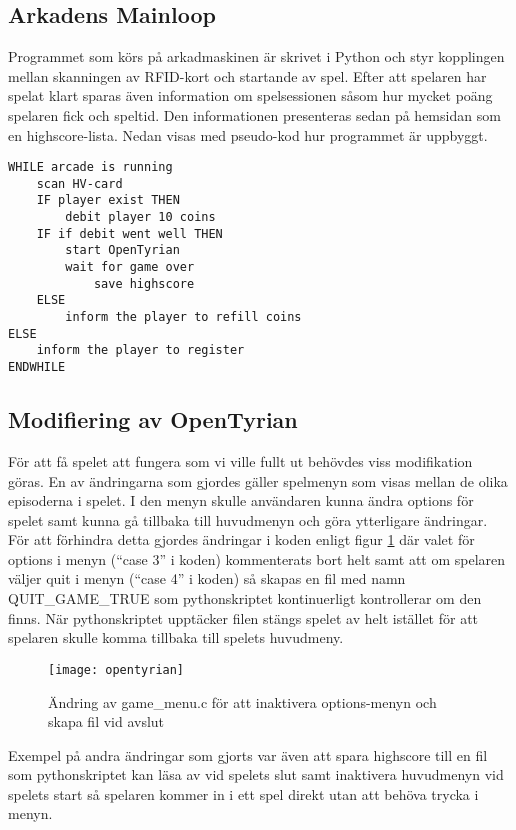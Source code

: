 \documentclass[12pt,fleqn,openany]{book} %
\begin{document}
\subsection{Arkadens Mainloop}
Programmet som körs på arkadmaskinen är skrivet i Python och styr kopplingen mellan skanningen av RFID-kort och startande av spel. 
Efter att spelaren har spelat klart sparas även information om spelsessionen såsom hur mycket poäng spelaren fick och speltid. 
Den informationen presenteras sedan på hemsidan som en highscore-lista. Nedan visas med pseudo-kod hur programmet är uppbyggt. 

\begin{verbatim}
WHILE arcade is running
    scan HV-card
    IF player exist THEN
        debit player 10 coins
    IF if debit went well THEN
        start OpenTyrian
        wait for game over
            save highscore
    ELSE
        inform the player to refill coins
ELSE
    inform the player to register
ENDWHILE
\end{verbatim}

\subsection{Modifiering av OpenTyrian}
För att få spelet att fungera som vi ville fullt ut behövdes viss modifikation göras. En av ändringarna som gjordes 
gäller spelmenyn som visas mellan de olika episoderna i spelet. I den menyn skulle användaren kunna ändra options för 
spelet samt kunna gå tillbaka till huvudmenyn och göra ytterligare ändringar. 
För att förhindra detta gjordes ändringar i koden enligt figur \ref{fig_opentyrian} där valet för options i menyn 
(“case 3” i koden) kommenterats bort helt samt att om spelaren väljer quit i menyn (“case 4” i koden) så skapas en 
fil med namn QUIT\_GAME\_TRUE som pythonskriptet kontinuerligt kontrollerar om den finns. När pythonskriptet upptäcker 
filen stängs spelet av helt istället för att spelaren skulle komma tillbaka till spelets huvudmeny.

\begin{figure}[!h]
\centering\texttt{[image: opentyrian]}
\caption{Ändring av game\_menu.c för att inaktivera options-menyn och skapa fil vid avslut}
\label{fig_opentyrian}
\end{figure}
Exempel på andra ändringar som gjorts var även att spara highscore till en fil som pythonskriptet kan läsa av vid 
spelets slut samt inaktivera huvudmenyn vid spelets start så spelaren kommer in i ett spel direkt utan att behöva 
trycka i menyn.
\end{document}

